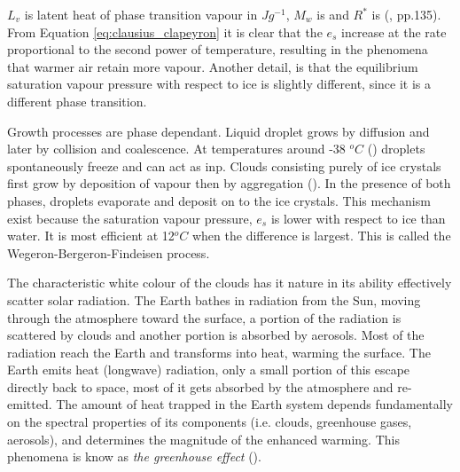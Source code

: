 $L_v$ is latent heat of phase transition vapour in $J g^{-1}$, $M_w$ is and $R^*$ is (\cite{cloud_phys_book_johanne}, pp.135). From Equation \eqref{eq:clausius_clapeyron} it is clear that the $e_s$ increase at the rate proportional to the second power of temperature, resulting in the phenomena that warmer air retain more vapour. Another detail, is that the equilibrium saturation vapour pressure with respect to ice is slightly different, since it is a different phase transition.


Growth processes are phase dependant. Liquid droplet grows by diffusion and later by collision and coalescence. At temperatures around -38 $^oC$ (\cite{lohmann2016}) droplets spontaneously freeze and can act as \acrshort{inp}. Clouds consisting purely of ice crystals first grow by deposition of vapour then by aggregation (\cite{Fowler1996LiquidAssumptions}). In the presence of both phases, droplets evaporate and deposit on to the ice crystals.
This mechanism exist because the saturation vapour pressure, $e_s$ is lower with respect to ice than water. It is most efficient at 12$^oC$ when the difference is largest. This is called the Wegeron-Bergeron-Findeisen process.

The characteristic white colour of the clouds has it nature in its ability effectively scatter solar radiation. %
The Earth bathes in radiation from the Sun, moving through the atmosphere toward the surface, a portion of the radiation is scattered by clouds and another portion is absorbed by aerosols. Most of the radiation reach the Earth and transforms into heat, warming the surface. The Earth emits heat (longwave) radiation, only a small portion of this escape directly back to space, most of it gets absorbed by the atmosphere and re-emitted. The amount of heat trapped in the Earth system depends fundamentally on the spectral properties of its components (i.e. clouds, greenhouse gases, aerosols), and determines the magnitude of the enhanced warming. This phenomena is know as \textit{the greenhouse effect} (\cite{greenhouse_effect}). 

